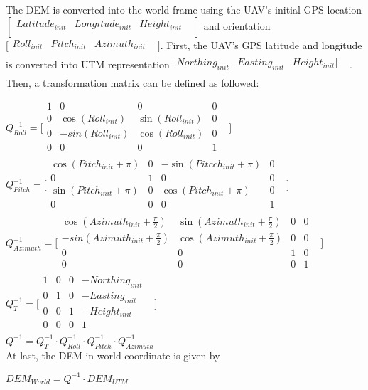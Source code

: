 The DEM is converted into the world frame using the UAV's initial GPS 
location$[\begin{matrix}
Latitude_{init} & Longitude_{init} & Height_{init} & \\
\end{matrix}
]$ and orientation$\lbrack \begin{matrix}
Roll_{init} & Pitch_{init } & Azimuth_{init} & \\
\end{matrix}
\rbrack $. First, the UAV's GPS latitude and longitude is converted 
into UTM representation$\begin{matrix}
[Northing_{init} & Easting_{init} & Height_{init}] & \\
\end{matrix}
$. Then, a transformation matrix can be defined as followed:

$Q_{Roll}^{-1}=\lbrack \begin{matrix}
1 & 0 & 0 & 0 & \\
0 & \cos (Roll_{init}) & \sin (Roll_{init}) & 0 & \\
0 & -sin(Roll_{init}) & \cos (Roll_{init}) & 0 & \\
0 & 0 & 0 & 1 & \\
\end{matrix}
\rbrack $\\


$Q_{Pitch}^{-1}=\lbrack \begin{matrix}
\cos (Pitch_{init}+\pi ) & 0 & -\sin (Pitcch_{init}+\pi ) & 0 & \\
0 & 1 & 0 & 0 & \\
\sin (Pitch_{init}+\pi ) & 0 & \cos (Pitch_{init}+\pi ) & 0 & \\
0 & 0 & 0 & 1 & \\
\end{matrix}
\rbrack $\\


$Q_{Azimuth}^{-1}=\lbrack \begin{matrix}
\cos (Azimuth_{init}+\frac{\pi }{2}) & \sin (Azimuth_{init}+\frac{\pi 
}{2}) & 0 & 0 & \\
-sin(Azimuth_{init}+\frac{\pi }{2}) & \cos (Azimuth_{init}+\frac{\pi 
}{2}) & 0 & 0 & \\
0 & 0 & 1 & 0 & \\
0 & 0 & 0 & 1 & \\
\end{matrix}
\rbrack $\\


$Q_{T}^{-1}=\lbrack \begin{matrix}
1 & 0 & 0 & -Northing_{init} & \\
0 & 1 & 0 & -Easting_{init} & \\
0 & 0 & 1 & -Height_{init} & \\
0 & 0 & 0 & 1 & \\
\end{matrix}
\rbrack $\\


$Q^{-1}=Q_{T}^{-1}\cdot Q_{Roll}^{-1}\cdot Q_{Pitch}^{-1}\cdot 
Q_{Azimuth}^{-1}$\\


At last, the DEM in world coordinate is given by

$DEM_{World}=Q^{-1}\cdot DEM_{UTM}$\\
